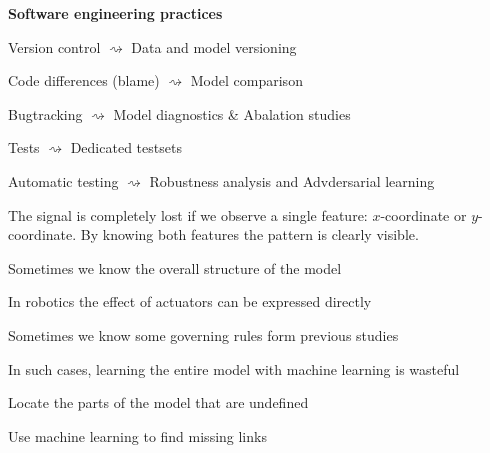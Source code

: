 \documentclass[landscape,footrule]{foils}
\begin{document}
\textbf{Software engineering practices}
\begin{triangles}
\item Version control $\rightsquigarrow$ Data and model versioning
\item Code differences (blame) $\rightsquigarrow$ Model comparison
\item Bugtracking $\rightsquigarrow$ Model diagnostics \& Abalation studies  
\item Tests $\rightsquigarrow$  Dedicated testsets
\item Automatic testing $\rightsquigarrow$ Robustness analysis and Advdersarial learning
\end{triangles}



The signal is completely lost if we observe a single feature: $x$-coordinate or $y$-coordinate. By knowing both features the pattern is clearly visible.




Sometimes we know the overall structure of the model
\begin{triangles}
 \item In robotics the effect of actuators can be expressed directly
 \item Sometimes we know some governing rules form previous studies
\end{triangles} 
In such cases, learning the entire model with machine learning is wasteful
\begin{triangles}
 \item Locate the parts of the model that are undefined
 \item Use machine learning to find missing links 
\end{triangles} 
\end{document}
